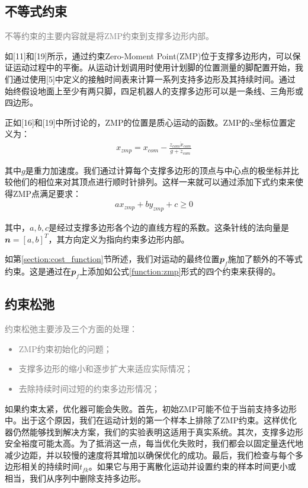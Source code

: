 \subsection[不等式约束]{不等式约束}

\textcolor{gray}{\small
    不等约束的主要内容就是将ZMP约束到支撑多边形内部。}

如[11]和[19]所示，通过约束Zero-Moment Point(ZMP)位于支撑多边形内，可以保证运动过程中的平衡。从运动计划调用时使用计划脚的位置测量的脚配置开始，我们通过使用[5]中定义的接触时间表来计算一系列支持多边形及其持续时间。通过始终假设地面上至少有两只脚，四足机器人的支撑多边形可以是一条线、三角形或四边形。

正如[16]和[19]中所讨论的，ZMP的位置是质心运动的函数。ZMP的x坐标位置定义为：
\begin{align}
    \label{function:zmp}
    x_{zmp}=x_{com}-\frac{z_{com}\ddot x_{com}}{g+\ddot z_{com}}
\end{align}

其中$g$是重力加速度。我们通过计算每个支撑多边形的顶点与中心点的极坐标并比较他们的相位来对其顶点进行顺时针排列。这样一来就可以通过添加下式约束来使得ZMP点满足要求：
\begin{align}
    ax_{zmp}+by_{zmp}+c\geq 0
\end{align}

其中，$a,b,c$是经过支撑多边形各个边的直线方程的系数。这条针线的法向量是$\mathbfit{n}=[a,b]^T$，其方向定义为指向约束多边形内部。

如第\ref{section:cost_function}节所述，我们对运动的最终位置$\mathbfit{p}_f$施加了额外的不等式约束。这是通过在$\mathbfit{p}_f$上添加如公式\eqref{function:zmp}形式的四个约束来获得的。


\subsection[约束松弛]{约束松弛}

\textcolor{gray}{\small
约束松弛主要涉及三个方面的处理：
\begin{itemize}
    \item ZMP约束初始化的问题；
    \item 支撑多边形的缩小和逐步扩大来适应实际情况；
    \item 去除持续时间过短的约束多边形情况；
\end{itemize}
}

如果约束太紧，优化器可能会失败。首先，初始ZMP可能不位于当前支持多边形中。出于这个原因，我们在运动计划的第一个样本上排除了ZMP约束。这样优化器仍然能够找到解决方案，我们的实验表明这适用于真实系统。其次，支撑多边形安全裕度可能太高。为了抵消这一点，每当优化失败时，我们都会以固定量迭代地减少边距，并以较慢的速度将其增加以确保优化的成功。最后，我们检查与每个多边形相关的持续时间$t_{fk}$。如果它与用于离散化运动并设置约束的样本时间更小或相当，我们从序列中删除支持多边形。























